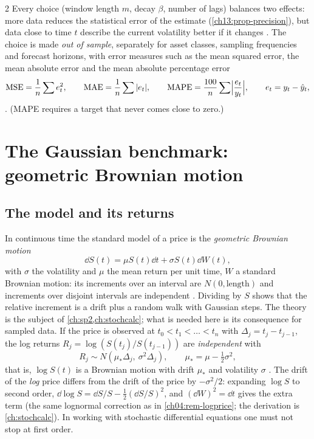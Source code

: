 \begin{paracol}{2}
Every choice (window length $m$, decay $\beta$, number of lags) balances two effects: more data reduces the statistical error of the estimate
(\cref{ch13:prop-precision}), but data close to time $t$ describe the current volatility better if it changes
. The choice is made \emph{out of sample}, separately for asset classes, sampling frequencies and forecast horizons,
with error measures such as the mean squared error, the mean absolute error and the mean absolute percentage error
\begin{equation}\label{ch13:eq-mape}
  \mathrm{MSE}=\frac1n\sum e_t^2,\qquad \mathrm{MAE}=\frac1n\sum|e_t|,\qquad
  \mathrm{MAPE}=\frac{100}n\sum\Bigl|\frac{e_t}{y_t}\Bigr|,\qquad e_t=y_t-\hat y_t,
\end{equation}
. (MAPE requires a target that never comes close to zero.)


\section{The Gaussian benchmark: geometric Brownian motion}\label{ch13:sec-gbm}

\subsection{The model and its returns}
In continuous time the standard model of a price is the \emph{geometric Brownian motion}
\begin{equation}\label{ch13:eq-gbm}
  \dd S(t)=\mu S(t)\dd t+\sigma S(t)\dd W(t),
\end{equation}
with $\sigma$ the volatility and $\mu$ the mean return per unit time, $W$ a standard Brownian motion: its increments over
an interval are $N(0,\text{length})$ and increments over disjoint intervals are independent
. Dividing by $S$ shows that the relative increment is a
drift plus a random walk with Gaussian steps. The theory is the subject of \cref{ch:sp2,ch:stochcalc}; what is needed here is its consequence for sampled data. If the price is observed at
$t_0<t_1<\dots<t_n$ with $\Delta_j=t_j-t_{j-1}$, the log returns $R_j=\log(S(t_j)/S(t_{j-1}))$ are \emph{independent} with
\begin{equation}\label{ch13:eq-gbmret}
  R_j\sim N(\mu_*\Delta_j,\ \sigma^2\Delta_j),\qquad \mu_*=\mu-\tfrac12\sigma^2 ,
\end{equation}
that is, $\log S(t)$ is a Brownian motion with drift $\mu_*$ and volatility $\sigma$ . The
drift of the \emph{log} price differs from the drift of the price by $-\sigma^2/2$: expanding $\log S$ to second order,
$\dd\log S=\dd S/S-\tfrac12(\dd S/S)^2$, and $(\dd W)^2=\dd t$ gives the extra term 
(the same lognormal correction as in \cref{ch04:rem-logprice}; the derivation is \cref{ch:stochcalc}). In working
with stochastic differential equations one must not stop at first order.


\end{paracol}
